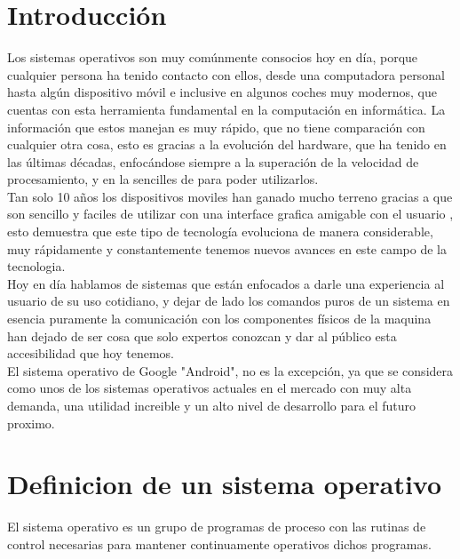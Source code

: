 \documentclass{bmcart}
\begin{document}
\newpage

\section*{Introducción}

Los sistemas operativos son muy comúnmente consocios hoy en día, porque cualquier persona ha tenido contacto con ellos, desde una computadora personal hasta algún dispositivo móvil e inclusive en algunos coches muy modernos, que cuentas con esta herramienta fundamental en la computación en informática.
La información que estos manejan es muy rápido, que no tiene comparación con cualquier otra cosa, esto es gracias a la evolución del hardware, que ha tenido en las últimas décadas, enfocándose siempre a la superación de la velocidad de procesamiento, y en la sencilles de para poder utilizarlos. \\

Tan solo 10 años los dispositivos moviles han ganado mucho terreno gracias a que son sencillo y faciles de utilizar con una interface grafica amigable con el usuario , esto demuestra que este tipo de tecnología evoluciona de manera considerable, muy rápidamente y constantemente tenemos nuevos avances en este campo de la tecnologia.\\

Hoy en día hablamos de sistemas que están enfocados a darle una experiencia al usuario de su uso cotidiano, y dejar de lado los comandos puros de un sistema en esencia puramente la comunicación con los componentes físicos de la maquina han dejado de ser cosa que solo expertos conozcan y dar al público esta accesibilidad que hoy tenemos.\\

El sistema operativo de Google "Android", no es la excepción, ya que se considera como unos de los sistemas operativos actuales en el mercado con muy alta demanda, una utilidad increible y un alto nivel de desarrollo para el futuro proximo.

\newpage

\section*{Definicion de un sistema operativo}

El sistema operativo es un grupo de programas de proceso con las rutinas de
control necesarias para mantener continuamente
operativos dichos programas.
\end{document}
